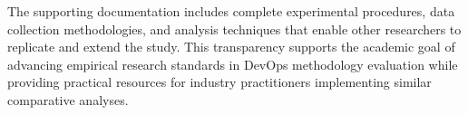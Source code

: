 The supporting documentation includes complete experimental procedures, data collection methodologies, and analysis techniques that enable other researchers to replicate and extend the study. This transparency supports the academic goal of advancing empirical research standards in DevOps methodology evaluation while providing practical resources for industry practitioners implementing similar comparative analyses.